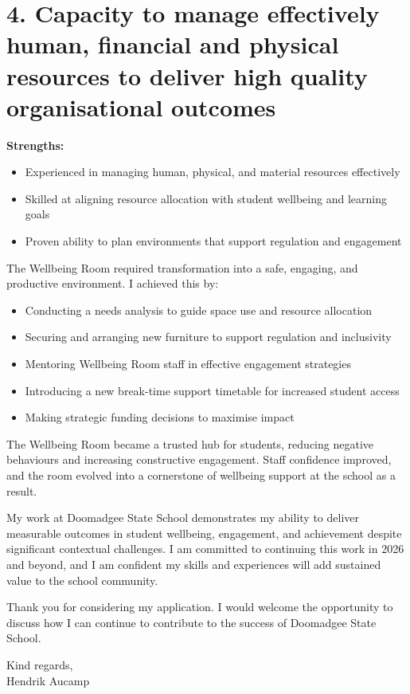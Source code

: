 \documentclass[11pt,a4paper]{article}
\begin{document}
\section*{4. Capacity to manage effectively human, financial and physical resources to deliver high quality organisational outcomes}

\textbf{Strengths:}
\begin{itemize}
    \item Experienced in managing human, physical, and material resources effectively
    \item Skilled at aligning resource allocation with student wellbeing and learning goals
    \item Proven ability to plan environments that support regulation and engagement
\end{itemize}

The Wellbeing Room required transformation into a safe, engaging, and productive environment. I achieved this by:
\begin{itemize}
    \item Conducting a needs analysis to guide space use and resource allocation
    \item Securing and arranging new furniture to support regulation and inclusivity
    \item Mentoring Wellbeing Room staff in effective engagement strategies
    \item Introducing a new break-time support timetable for increased student access
    \item Making strategic funding decisions to maximise impact
\end{itemize}

The Wellbeing Room became a trusted hub for students, reducing negative behaviours and increasing constructive engagement. Staff confidence improved, and the room evolved into a cornerstone of wellbeing support at the school as a result.

My work at Doomadgee State School demonstrates my ability to deliver measurable outcomes in student wellbeing, engagement, and achievement despite significant contextual challenges. I am committed to continuing this work in 2026 and beyond, and I am confident my skills and experiences will add sustained value to the school community.

Thank you for considering my application. I would welcome the opportunity to discuss how I can continue to contribute to the success of Doomadgee State School.

\vspace{1cm}

Kind regards, \\
\vspace{0.5cm}
Hendrik Aucamp
\end{document}
